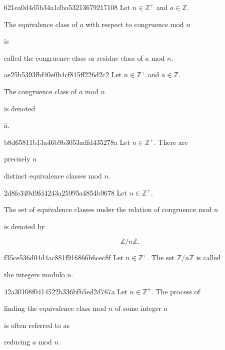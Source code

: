 \begin{note}{621ea0d4d5b34a1dba53213679217108}
    Let \({ n \in \mathbb Z^{+} }\) and \({ a \in \mathbb Z }\).
    \begin{icloze}{1}The equivalence class of \({ a }\) with respect to congruence mod \({ n }\)\end{icloze} is \begin{icloze}{2}called the congruence class or residue class of \({ a }\) mod \({ n }\).\end{icloze}
\end{note}

\begin{note}{ae25b5393fbf40e0b4cf815ff226d2c2}
    Let \({ n \in \mathbb Z^{+} }\) and \({ a \in \mathbb Z }\).
    \begin{icloze}{2}The congruence class of \({ a }\) mod \({ n }\)\end{icloze} is denoted \begin{icloze}{1}\({ \bar a }\).\end{icloze}
\end{note}

\begin{note}{b8d65811b13a46b9b3053adfd435278a}
    Let \({ n \in \mathbb Z^{+} }\).
    There are \begin{icloze}{1}precisely \({ n }\)\end{icloze} distinct equivalence classes mod \({ n }\).
\end{note}

\begin{note}{2d8fe349d9fd4243a25995a4854b9678}
    Let \({ n \in \mathbb Z^{+} }\).
    \begin{icloze}{1}The set of equivalence classes under the relation of congruence mod \({ n }\)\end{icloze} is denoted by
    \begin{icloze}{2}
        \[
            \mathbb Z / n\mathbb Z.
        \]
    \end{icloze}
\end{note}

\begin{note}{f35ce536d04d4ac881f916866b6cec8f}
    Let \({ n \in \mathbb Z^{+} }\).
    The set \({ \mathbb Z / n\mathbb Z }\) is called \begin{icloze}{1}the integers modulo \({ n }\).\end{icloze}
\end{note}

\begin{note}{42a30108f0414522b336bfb5ed2d767a}
    Let \({ n \in \mathbb Z^{+} }\).
    The process of \begin{icloze}{2}finding the equivalence class mod \({ n }\) of some integer \({ a }\)\end{icloze} is often referred to as \begin{icloze}{1}reducing \({ a }\) mod \({ n }\).\end{icloze}
\end{note}

